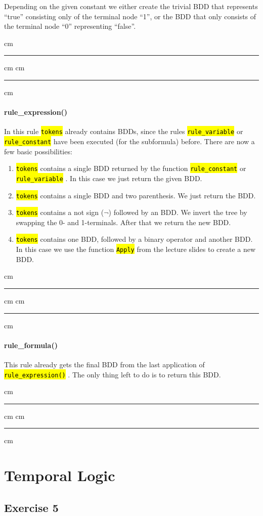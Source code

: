 \documentclass[a4paper, 11pt]{article}
\newcommand{\codeinput}[1]
{
    \vskip 0.3 cm
    {\color{lightgray}\hrule}\vskip 0.3 cm
    {\fontsize{9pt}{11pt}}
    \vskip 0.3 cm{\color{lightgray}\hrule}
    \vskip 0.3 cm
}
\newcommand{\code}[1]
{
    \hl{\texttt{#1}}
}
\begin{document}
Depending on the given constant we either create the trivial BDD that represents “true” consisting only of the terminal node “1”, or the BDD that only consists of the terminal node “0” representing “false”.

\codeinput{rule_constant}

\paragraph{rule\_expression()}

In this rule \code{tokens} already contains BDDs, since the rules \code{rule\_variable} or \code{rule\_constant} have been executed (for the subformula) before. There are now a few basic possibilities:

\begin{enumerate}
    \item \code{tokens} contains a single BDD returned by the function \code{rule\_constant} or \code{rule\_variable}. In this case we just return the given BDD.
    \item \code{tokens} contains a single BDD and two parenthesis. We just return the BDD.
    \item \code{tokens} contains a not sign ($¬$) followed by an BDD. We invert the tree by swapping the 0- and 1-terminals. After that we return the new BDD.
    \item \code{tokens} contains one BDD, followed by a binary operator and another BDD. In this case we use the function \code{Apply} from the lecture slides to create a new BDD.
\end{enumerate}

\codeinput{rule_expression}

\paragraph{rule\_formula()}

This rule already gets the final BDD from the last application of \code{rule\_expression()}. The only thing left to do is to return this BDD.

\codeinput{rule_formula}

\newpage
\section{Temporal Logic}

\subsection{Exercise 5}
\end{document}
